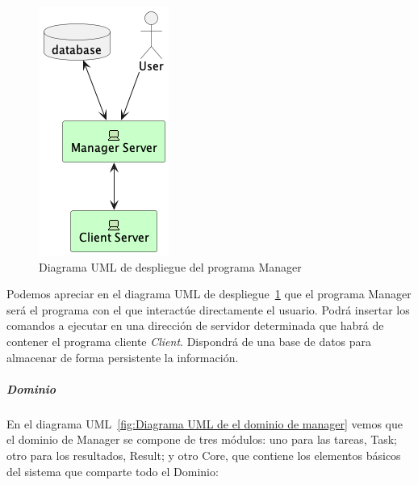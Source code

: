 \begin{figure}[H]
    \centering
    \includegraphics[height=0.3\textheight]{./part/Proyecto_ejecutivo/memoria_descriptiva/descripcionDelProyecto/manager/uml/managerServerConcept}
    \caption{Diagrama UML de despliegue del programa Manager}\label{fig:diagrama_uml_de_despliegue_del_manager}
\end{figure}

Podemos apreciar en el diagrama UML de despliegue~\cref{fig:diagrama_uml_de_despliegue_del_manager} que el programa Manager será el programa con el que interactúe directamente el usuario.
Podrá insertar los comandos a ejecutar en una dirección de servidor determinada que habrá de contener el programa cliente \textit{Client}.
Dispondrá de una base de datos para almacenar de forma persistente la información.

\subparagraph{Dominio}

En el diagrama UML~\cref{fig:Diagrama UML de el dominio de manager} vemos que el dominio de Manager se compone de tres módulos: uno para las tareas, Task;
otro para los resultados, Result;
y otro Core, que contiene los elementos básicos del sistema que comparte todo el Dominio:

